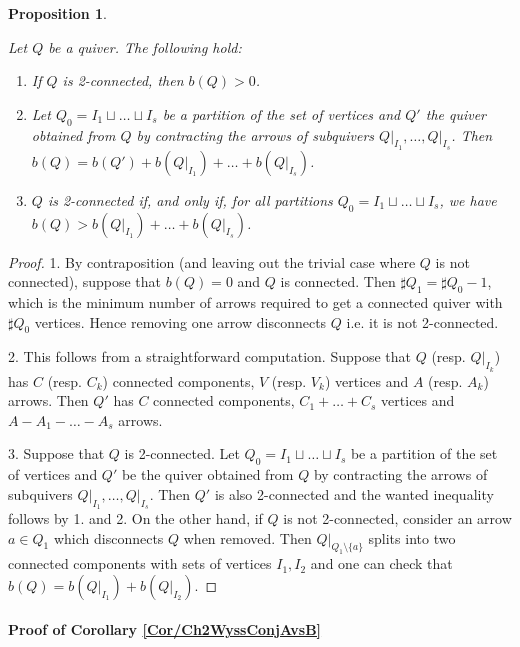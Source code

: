 \documentclass[11pt,english]{article}
\numberwithin{equation}{section}
\numberwithin{figure}{section}
\theoremstyle{definition}
\theoremstyle{plain}
\newtheorem{prop}[df]{Proposition}
\theoremstyle{remark}
\begin{document}
\begin{prop} \label{Prop/BettiNb}

Let $Q$ be a quiver. The following hold:
\begin{enumerate}
\item If $Q$ is 2-connected, then $b(Q)>0$.
\item Let $Q_{0}=I_{1}\sqcup\ldots\sqcup I_{s}$ be a partition of the set
of vertices and $Q'$ the quiver obtained from $Q$ by contracting
the arrows of subquivers $Q\vert_{I_{1}},\ldots,Q\vert_{I_{s}}$.
Then $b(Q)=b(Q')+b(Q\vert_{I_{1}})+\ldots+b(Q\vert_{I_{s}})$.
\item $Q$ is 2-connected if, and only if, for all partitions $Q_{0}=I_{1}\sqcup\ldots\sqcup I_{s}$,
we have $b(Q)>b(Q\vert_{I_{1}})+\ldots+b(Q\vert_{I_{s}})$.
\end{enumerate}
\end{prop}

\begin{proof}

1. By contraposition (and leaving out the trivial case where $Q$
is not connected), suppose that $b(Q)=0$ and $Q$ is connected. Then
$\sharp Q_{1}=\sharp Q_{0}-1$, which is the minimum number of arrows
required to get a connected quiver with $\sharp Q_{0}$ vertices.
Hence removing one arrow disconnects $Q$ i.e. it is not 2-connected.

2. This follows from a straightforward computation. Suppose that $Q$
(resp. $Q\vert_{I_{k}}$) has $C$ (resp. $C_{k}$) connected components,
$V$ (resp. $V_{k}$) vertices and $A$ (resp. $A_{k}$) arrows. Then
$Q'$ has $C$ connected components, $C_{1}+\ldots+C_{s}$ vertices
and $A-A_{1}-\ldots-A_{s}$ arrows.

3. Suppose that $Q$ is 2-connected. Let $Q_{0}=I_{1}\sqcup\ldots\sqcup I_{s}$
be a partition of the set of vertices and $Q'$ be the quiver obtained
from $Q$ by contracting the arrows of subquivers $Q\vert_{I_{1}},\ldots,Q\vert_{I_{s}}$.
Then $Q'$ is also 2-connected and the wanted inequality follows by
1. and 2. On the other hand, if $Q$ is not 2-connected, consider
an arrow $a\in Q_{1}$ which disconnects $Q$ when removed. Then $Q\vert_{Q_{1}\setminus\{a\}}$
splits into two connected components with sets of vertices $I_{1},I_{2}$
and one can check that $b(Q)=b(Q\vert_{I_{1}})+b(Q\vert_{I_{2}})$.
\end{proof}

\paragraph*{Proof of Corollary \ref{Cor/Ch2WyssConjAvsB}}
\end{document}
